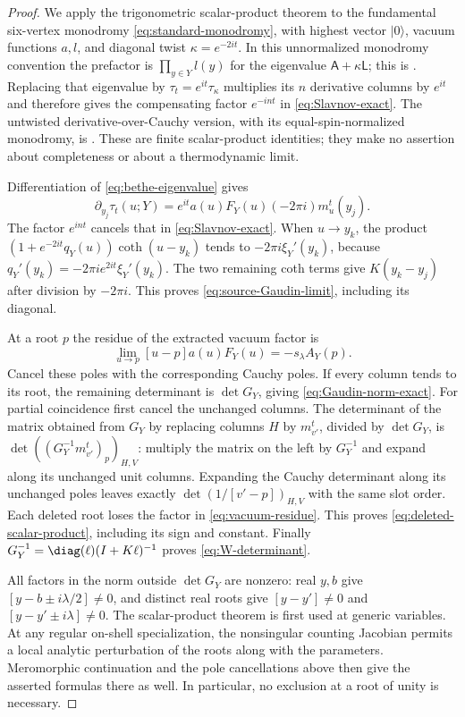 \begin{proof}
We apply the trigonometric scalar-product theorem to the fundamental
six-vertex monodromy \eqref{eq:standard-monodromy}, with highest vector
$|0\rangle$, vacuum functions $a,l$, and diagonal twist
$\kappa=e^{-2it}$.  In this unnormalized monodromy convention the
prefactor is $\prod_{y\in Y}l(y)$ for the eigenvalue
$\mathsf A+\kappa\mathsf L$; this is
\cite[Proposition~3.1, equations~(3.8)--(3.9)]{KMST2005}.
Replacing that eigenvalue by $\tau_t=e^{it}\tau_\kappa$ multiplies its
$n$ derivative columns by $e^{it}$ and therefore gives the compensating
factor $e^{-int}$ in \eqref{eq:Slavnov-exact}.  The untwisted
derivative-over-Cauchy version, with its equal-spin-normalized
monodromy, is \cite[Theorem~3.1, equations~(3.4)--(3.5)]{KMT1999}.
These are finite scalar-product identities; they make no assertion
about completeness or about a thermodynamic limit.

Differentiation of \eqref{eq:bethe-eigenvalue} gives
\[
 \partial_{y_j}\tau_t(u;Y)
     =e^{it}a(u)F_Y(u)(-2\pi i)m_u^t(y_j).
\]
The factor $e^{int}$ cancels that in
\eqref{eq:Slavnov-exact}.  When $u\to y_k$, the product
$(1+e^{-2it}q_Y(u))\coth(u-y_k)$ tends to
$-2\pi i\xi_Y'(y_k)$, because
$q_Y'(y_k)=-2\pi i e^{2it}\xi_Y'(y_k)$.
The two remaining coth terms give $K(y_k-y_j)$ after division by
$-2\pi i$.  This proves \eqref{eq:source-Gaudin-limit}, including its
diagonal.

At a root $p$ the residue of the extracted vacuum factor is
\begin{equation}\label{eq:vacuum-residue}
 \lim_{u\to p}[u-p]a(u)F_Y(u)=-s_\lambda A_Y(p).
\end{equation}
Cancel these poles with the corresponding Cauchy poles.  If every
column tends to its root, the remaining determinant is $\det G_Y$,
giving \eqref{eq:Gaudin-norm-exact}.  For partial coincidence first
cancel the unchanged columns.  The determinant of the matrix obtained
from $G_Y$ by replacing columns $H$ by $m_{v'}^t$, divided by
$\det G_Y$, is
$\det((G_Y^{-1}m_{v'}^t)_p)_{H,V}$: multiply the matrix on the left by
$G_Y^{-1}$ and expand along its unchanged unit columns.  Expanding the
Cauchy determinant along its unchanged poles leaves exactly
$\det(1/[v'-p])_{H,V}$ with the same slot order.  Each deleted root
loses the factor in \eqref{eq:vacuum-residue}.  This proves
\eqref{eq:deleted-scalar-product}, including its sign and constant.
Finally $G_Y^{-1}=\diag(\ell)(I+K\ell)^{-1}$ proves
\eqref{eq:W-determinant}.

All factors in the norm outside $\det G_Y$ are nonzero: real $y,b$
give $[y-b\pm i\lambda/2]\ne0$, and distinct real roots give
$[y-y']\ne0$ and $[y-y'\pm i\lambda]\ne0$.
The scalar-product theorem is first used at generic variables.
At any regular on-shell specialization, the nonsingular counting
Jacobian permits a local analytic perturbation of the roots along
with the parameters.  Meromorphic continuation and the pole
cancellations above then give the asserted formulas there as well.
In particular, no exclusion at a root of unity is necessary.
\end{proof}

